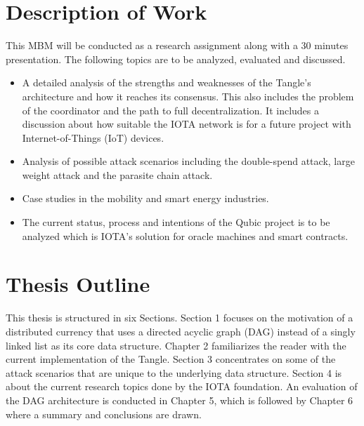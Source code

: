 \section{Description of Work}
This MBM will be conducted as a research assignment along with a 30 minutes presentation. The following topics are to be analyzed, evaluated and discussed.
\begin{itemize}
    \item A detailed analysis of the strengths and weaknesses of the Tangle's architecture and how it reaches its consensus. This also includes the problem of the coordinator and the path to full decentralization. It includes a discussion about how suitable the IOTA network is for a future project with Internet-of-Things (IoT) devices.
    \item Analysis of possible attack scenarios including the double-spend attack, large weight attack and the parasite chain attack.
    \item Case studies in the mobility and smart energy industries.
    \item The current status, process and intentions of the Qubic project is to be analyzed which is IOTA's solution for oracle machines and smart contracts.
\end{itemize}

\section{Thesis Outline}

This thesis is structured in six Sections. Section 1 focuses on the motivation of a distributed currency that uses a directed acyclic graph (DAG) instead of a singly linked list as its core data structure. Chapter 2 familiarizes the reader with the current implementation of the Tangle. Section 3 concentrates on some of the attack scenarios that are unique to the underlying data structure. Section 4 is about the current research topics done by the IOTA foundation. An evaluation of the DAG architecture is conducted in Chapter 5, which is followed by Chapter 6 where a summary and conclusions are drawn.